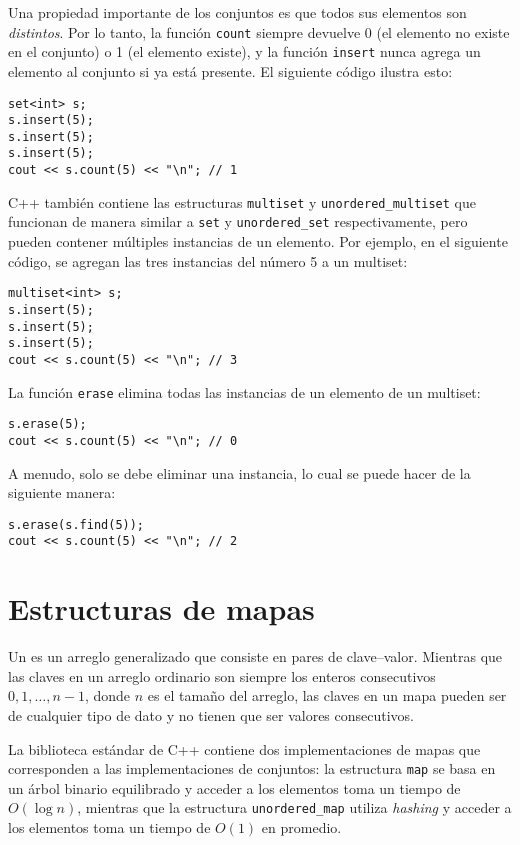 Una propiedad importante de los conjuntos es
que todos sus elementos son \emph{distintos}.
Por lo tanto, la función \texttt{count} siempre devuelve
0 (el elemento no existe en el conjunto)
o 1 (el elemento existe),
y la función \texttt{insert} nunca agrega
un elemento al conjunto si ya está
presente. El siguiente código ilustra esto:

\begin{lstlisting}
set<int> s;
s.insert(5);
s.insert(5);
s.insert(5);
cout << s.count(5) << "\n"; // 1
\end{lstlisting}

C++ también contiene las estructuras
\texttt{multiset} y \texttt{unordered\_multiset}
que funcionan de manera similar a \texttt{set}
y \texttt{unordered\_set} respectivamente,
pero pueden contener múltiples instancias de un elemento.
Por ejemplo, en el siguiente código, se agregan las tres instancias
del número 5 a un multiset:

\begin{lstlisting}
multiset<int> s;
s.insert(5);
s.insert(5);
s.insert(5);
cout << s.count(5) << "\n"; // 3
\end{lstlisting}
La función \texttt{erase} elimina
todas las instancias de un elemento
de un multiset:
\begin{lstlisting}
s.erase(5);
cout << s.count(5) << "\n"; // 0
\end{lstlisting}
A menudo, solo se debe eliminar una instancia,
lo cual se puede hacer de la siguiente manera:
\begin{lstlisting}
s.erase(s.find(5));
cout << s.count(5) << "\n"; // 2
\end{lstlisting}

\section{Estructuras de mapas}


Un  es un arreglo generalizado
que consiste en pares de clave--valor.
Mientras que las claves en un arreglo ordinario son siempre
los enteros consecutivos $0,1,\ldots,n-1$,
donde $n$ es el tamaño del arreglo,
las claves en un mapa pueden ser de cualquier tipo de dato y
no tienen que ser valores consecutivos.

La biblioteca estándar de C++ contiene dos implementaciones de mapas
que corresponden a las implementaciones de conjuntos: la estructura
\texttt{map} se basa en un árbol binario equilibrado y acceder a los elementos
toma un tiempo de $O(\log n)$,
mientras que la estructura
\texttt{unordered\_map} utiliza \textit{hashing}
y acceder a los elementos toma un tiempo de $O(1)$ en promedio.

